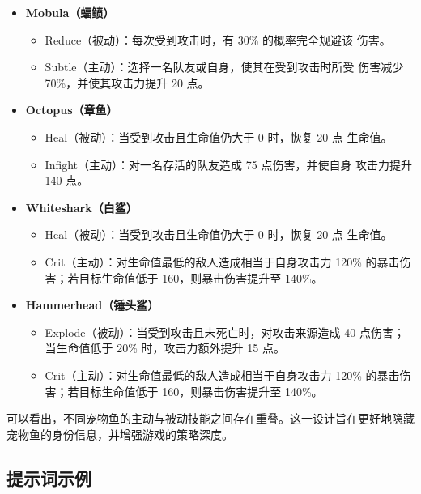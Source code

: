 \begin{itemize}
\begin{itemize}
        \end{itemize}
    \item \textbf{Mobula（蝠鲼）}
        \begin{itemize}
            \item Reduce（被动）：每次受到攻击时，有 30\% 的概率完全规避该
                  伤害。
            \item Subtle（主动）：选择一名队友或自身，使其在受到攻击时所受
                  伤害减少 70\%，并使其攻击力提升 20 点。
        \end{itemize}
    \item \textbf{Octopus（章鱼）}
        \begin{itemize}
            \item Heal（被动）：当受到攻击且生命值仍大于 0 时，恢复 20 点
                  生命值。
            \item Infight（主动）：对一名存活的队友造成 75 点伤害，并使自身
                  攻击力提升 140 点。
        \end{itemize}
    \item \textbf{Whiteshark（白鲨）}
        \begin{itemize}
            \item Heal（被动）：当受到攻击且生命值仍大于 0 时，恢复 20 点
                  生命值。
            \item Crit（主动）：对生命值最低的敌人造成相当于自身攻击力 120\%
                  的暴击伤害；若目标生命值低于 160，则暴击伤害提升至 140\%。
        \end{itemize}
    \item \textbf{Hammerhead（锤头鲨）}
        \begin{itemize}
            \item Explode（被动）：当受到攻击且未死亡时，对攻击来源造成 40
                  点伤害；当生命值低于 20\% 时，攻击力额外提升 15 点。
            \item Crit（主动）：对生命值最低的敌人造成相当于自身攻击力 120\%
                  的暴击伤害；若目标生命值低于 160，则暴击伤害提升至 140\%。
        \end{itemize}
\end{itemize}

可以看出，不同宠物鱼的主动与被动技能之间存在重叠。这一设计旨在更好地隐藏
宠物鱼的身份信息，并增强游戏的策略深度。

\subsection{提示词示例}

